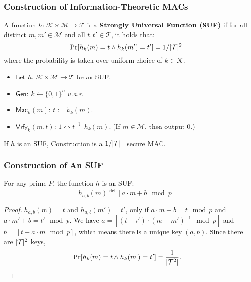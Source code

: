 \begin{frame}\frametitle{Construction of Information-Theoretic MACs}
\begin{definition}
A function $h$: $\mathcal{K} \times \mathcal{M} \to \mathcal{T}$ is a \textbf{Strongly Universal Function (SUF)} if for all distinct $m, m' \in \mathcal{M}$ and all $t, t' \in \mathcal{T}$, it holds that:
\[ \Pr [h_k(m) = t  \land h_k(m') = t'] = 1 / \lvert\mathcal{T}\rvert^2.
\]
where the probability is taken over uniform choice of $k \in \mathcal{K}$.
\end{definition}
\begin{construction}
\begin{itemize}
\item Let $h$: $\mathcal{K} \times \mathcal{M} \to \mathcal{T}$ be an SUF.
\item $\mathsf{Gen}$: $k \gets \{0,1\}^n$ \emph{u.a.r}.
\item $\mathsf{Mac}_k(m)$: $t := h_k(m)$.
\item $\mathsf{Vrfy}_k(m,t)$: $1 \iff t \overset{?}{=} h_k(m)$. (If $m \in \mathcal{M}$, then output 0.)
\end{itemize}
\end{construction}
\begin{theorem}
If $h$ is an SUF, Construction is a $1/\lvert\mathcal{T}\rvert-$secure MAC.
\end{theorem}
\end{frame}
\begin{frame}\frametitle{Construction of An SUF}
\begin{theorem}
For any prime $P$, the function $h$ is an SUF:
\[ h_{a,b}(m) \overset{\mathsf{def}}{=} [ a \cdot m + b \mod p]
\]
\end{theorem}
\begin{proof}
$h_{a,b}(m) = t$ and $h_{a,b}(m') = t'$, only if 
$a \cdot m + b  = t \mod p$  and  $a \cdot m' + b = t' \mod p$. We have $a = [(t-t') \cdot (m - m')^{-1} \mod p]$ and $b = [t - a \cdot m \mod p]$, which means there is a unique key $(a, b)$. Since there are $\lvert\mathcal{T}\rvert^2$ keys, 
\[ \Pr [h_k(m) = t  \land h_k(m') = t'] = \frac{1}{\lvert\mathcal{T}^2\rvert}.
\]
\end{proof}
\end{frame}
